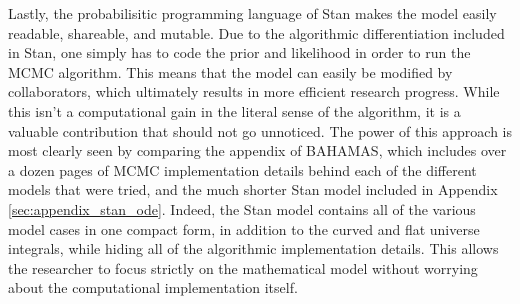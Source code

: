 Lastly, the probabilisitic programming language of Stan makes the model easily readable, shareable, and mutable. Due to the algorithmic differentiation included in Stan, one simply has to code the prior and likelihood in order to run the MCMC algorithm. This means that the model can easily be modified by collaborators, which ultimately results in more efficient research progress. While this isn't a computational gain in the literal sense of the algorithm, it is a valuable contribution that should not go unnoticed. The power of this approach is most clearly seen by comparing the appendix of BAHAMAS, which includes over a dozen pages of MCMC implementation details behind each of the different models that were tried, and the much shorter Stan model included in Appendix \ref{sec:appendix_stan_ode}. Indeed, the Stan model contains all of the various model cases in one compact form, in addition to the curved and flat universe integrals, while hiding all of the algorithmic implementation details. This allows the researcher to focus strictly on the mathematical model without worrying about the computational implementation itself.
